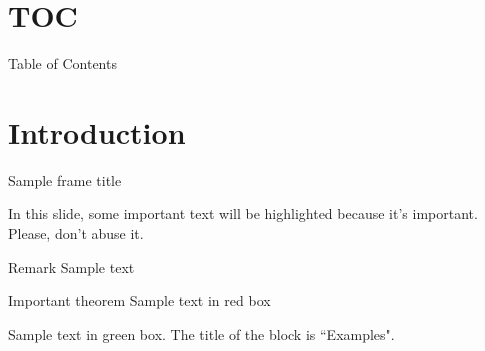 \documentclass[
xcolor={svgnames},
hyperref={pagebackref,bookmarks}
]{beamer}
\title{\presentationtitle}
\subtitle{\presentationsubtitle}
\author{\presenter}
\institute[UTD]{
    \school\\
    \university\\
    {\color{DarkBlue} \faIcon{envelope-open-text} \email}\\
    {\color{DarkBlue} \faIcon{globe} \personalwebsite}
    }
\date{\today}
\begin{document}
\maketitle

\section{TOC}
\begin{frame}{Table of Contents}
\tableofcontents
\end{frame}

\section{Introduction}
\begin{frame}{Sample frame title}

In this slide, some important text will be
\alert{highlighted} because it's important.
Please, don't abuse it.

\begin{block}{Remark}
Sample text
\end{block}

\begin{alertblock}{Important theorem}
Sample text in red box
\end{alertblock}

\begin{examples}
Sample text in green box. The title of the block is ``Examples".
\end{examples}

\end{frame}
\end{document}
